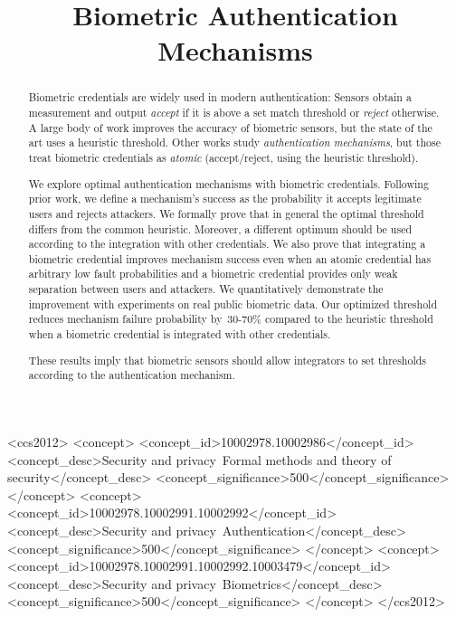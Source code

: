 \documentclass[sigconf]{acmart}
\theoremstyle{definition}
\begin{document}
\title{Biometric Authentication Mechanisms}



\renewcommand{\shortauthors}{Malka et al.}

\begin{abstract}
Biometric credentials are widely used in modern authentication: 
Sensors obtain a measurement and output \emph{accept} if it is above a set match threshold or \emph{reject} otherwise. 
A large body of work improves the accuracy of biometric sensors, but the state of the art uses a heuristic threshold. 
Other works study \emph{authentication mechanisms}, but those treat biometric credentials as \emph{atomic} (accept/reject, using the heuristic threshold). 

We explore optimal authentication mechanisms with biometric credentials. 
Following prior work, we define a mechanism's success as the probability it accepts legitimate users and rejects attackers. 
We formally prove that in general the optimal threshold differs from the common heuristic. 
Moreover, a different optimum should be used according to the integration with other credentials. 
We also prove that integrating a biometric credential improves mechanism success even when an atomic credential has arbitrary low fault probabilities and a biometric credential provides only weak separation between users and attackers. 
We quantitatively demonstrate the improvement with experiments on real public biometric data. 
Our optimized threshold reduces mechanism failure probability by~30-70\% compared to the heuristic threshold when a biometric credential is integrated with other credentials. 

These results imply that biometric sensors should allow integrators to set thresholds according to the authentication mechanism.
\end{abstract}

\begin{CCSXML}
<ccs2012>
   <concept>
       <concept_id>10002978.10002986</concept_id>
       <concept_desc>Security and privacy~Formal methods and theory of security</concept_desc>
       <concept_significance>500</concept_significance>
       </concept>
   <concept>
       <concept_id>10002978.10002991.10002992</concept_id>
       <concept_desc>Security and privacy~Authentication</concept_desc>
       <concept_significance>500</concept_significance>
       </concept>
   <concept>
       <concept_id>10002978.10002991.10002992.10003479</concept_id>
       <concept_desc>Security and privacy~Biometrics</concept_desc>
       <concept_significance>500</concept_significance>
       </concept>
 </ccs2012>
\end{CCSXML}
\end{document}
